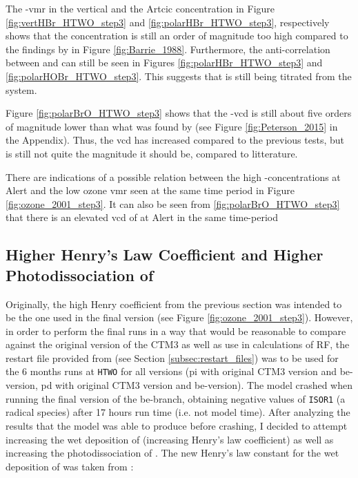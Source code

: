 \medskip

The -\acrshort{vmr} in the vertical and the Artcic concentration in Figure \ref{fig:vertHBr_HTWO_step3} and \ref{fig:polarHBr_HTWO_step3}, respectively shows that the  concentration is still an order of magnitude too high compared to the findings by \cite{barrie} in Figure \ref{fig:Barrie_1988}. Furthermore, the anti-correlation between  and  can still be seen in Figures \ref{fig:polarHBr_HTWO_step3} and \ref{fig:polarHOBr_HTWO_step3}. This suggests that  is still being titrated from the system. 

\medskip

Figure \ref{fig:polarBrO_HTWO_step3} shows that the -\acrshort{vcd} is still about five orders of magnitude lower than what was found by \cite{Peterson2015} (see Figure \ref{fig:Peterson_2015} in the Appendix). Thus, the \acrshort{vcd} has increased compared to the previous tests, but is still not quite the magnitude it should be, compared to litterature. 

\medskip

There are indications of a possible relation between the high -concentrations at Alert and the low ozone \acrshort{vmr} seen at the same time period in Figure \ref{fig:ozone_2001_step3}. It can also be seen from \ref{fig:polarBrO_HTWO_step3} that there is an elevated \acrshort{vcd} of  at Alert in the same  time-period

\subsection{Higher Henry's Law Coefficient and Higher Photodissociation of }\label{sec:disc_step4}

Originally, the high Henry coefficient from the previous section was intended to be the one used in the final version (see Figure \ref{fig:ozone_2001_step3}). However, in order to perform the final runs in a way that would be reasonable to compare against the original version of the CTM3 as well as use in calculations of RF, the restart file provided from \cite{StefaniePersonal} (see Section \ref{subsec:restart_files}) was to be used for the 6 months runs at \texttt{HTWO} for all versions (\acrfull{pi} with original CTM3 version and \acrfull{be}-version, \acrfull{pd} with original CTM3 version and \acrshort{be}-version). The model crashed when running the final version of the \acrshort{be}-branch, obtaining negative values of \texttt{ISOR1} (a radical species) after 17 hours run time (i.e. not model time). After analyzing the results that the model was able to produce before crashing, I decided to attempt increasing the wet deposition of  (increasing Henry's law coefficient) as well as increasing the photodissociation of . The new Henry's law constant for the wet deposition of  was taken from \cite{Sander99}: 

